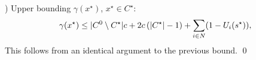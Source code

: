 ) Upper bounding $\gamma(x^\star)$, $x^\star\in C^\star:$
$$\gamma(x^\star) \leq |C^0\setminus C^\star|c + 2c\left(|C^\star|-1\right) + \sum_{i\in N}(1 - U_i(s^\star)),$$ 
 This follows from an identical argument to the previous bound.
\hfill\qed










